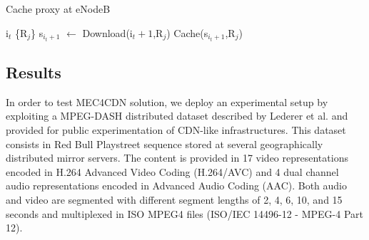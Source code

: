 \begin{algorithm}
	\renewcommand{\algorithmicrequire}{\textbf{Input:}}
	\renewcommand{\algorithmicensure}{\textbf{Output:}}
	\caption{Cache proxy at eNodeB}
	\label{alg:BMSB2018algorithmCache}
	\begin{algorithmic}
		
		 
		\State i$_{t}$ 
		\State \{R$_{j}$\} 
		 
		\State s$_{i_{t}+1}$ $\leftarrow$  Download(i$_{t}+1$,R$_j$) 
		\State Cache(s$_{i_{t}+1}$,R$_j$) 
		\EndFor
		\EndProcedure
		
	\end{algorithmic}
\end{algorithm}


\subsection{Results}
\label{sec:BMSB2018results}

In order to test MEC4CDN solution, we deploy an experimental setup by exploiting a MPEG-DASH distributed dataset described by Lederer et al. \cite{lederer2013} and provided for public experimentation of CDN-like infrastructures. This dataset consists in Red Bull Playstreet sequence stored at several geographically distributed mirror servers. The content is provided in 17 video representations encoded in H.264 Advanced Video Coding (H.264/AVC) and 4 dual channel audio representations encoded in Advanced Audio Coding (AAC). Both audio and video are segmented with different segment lengths of 2, 4, 6, 10, and 15 seconds and multiplexed in ISO MPEG4 files (ISO/IEC 14496-12 - MPEG-4 Part 12).

